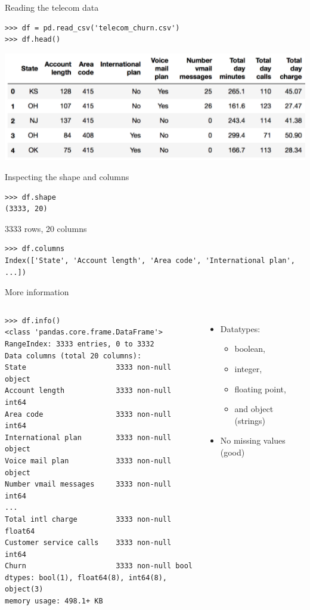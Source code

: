 \documentclass[aspectratio=169,usenames,dvipsnames]{beamer}
\begin{document}
\begin{frame}[fragile]{Reading the telecom data}
\begin{lstlisting}
>>> df = pd.read_csv('telecom_churn.csv')
>>> df.head()
\end{lstlisting}

\includegraphics[width=0.9\linewidth]{fig/telecom}

\end{frame}

\begin{frame}[fragile]{Inspecting the shape and columns}
\begin{lstlisting}
>>> df.shape
(3333, 20)
\end{lstlisting}

3333 rows, 20 columns

\begin{lstlisting}
>>> df.columns
Index(['State', 'Account length', 'Area code', 'International plan', ...])
\end{lstlisting}
\end{frame}

\begin{frame}[fragile]{More information}
\begin{columns}
\begin{lstlisting}
>>> df.info()
<class 'pandas.core.frame.DataFrame'>
RangeIndex: 3333 entries, 0 to 3332
Data columns (total 20 columns):
State                     3333 non-null object
Account length            3333 non-null int64
Area code                 3333 non-null int64
International plan        3333 non-null object
Voice mail plan           3333 non-null object
Number vmail messages     3333 non-null int64
...
Total intl charge         3333 non-null float64
Customer service calls    3333 non-null int64
Churn                     3333 non-null bool
dtypes: bool(1), float64(8), int64(8), object(3)
memory usage: 498.1+ KB
\end{lstlisting}
    \begin{itemize}
        \item Datatypes:
        \begin{itemize}\item boolean, \item integer, \item floating point, \item and object (strings)\end{itemize}
        \item No missing values (good)
    \end{itemize}
\end{columns}
\end{frame}
\end{document}
